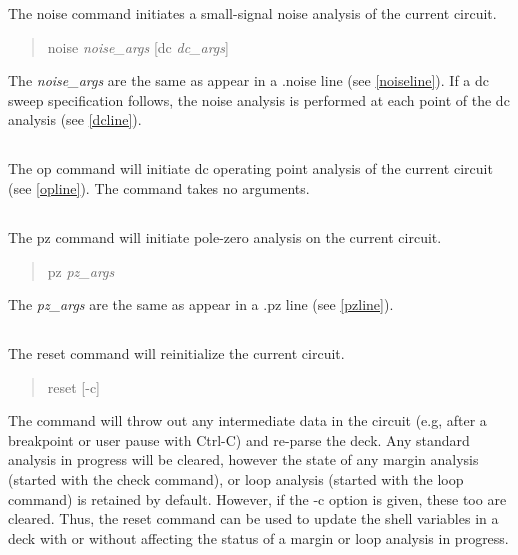 The {\cb noise} command initiates a small-signal noise analysis of the
current circuit.
\begin{quote}\vt
noise {\it noise\_args} [dc {\it dc\_args\/}]
\end{quote}
The {\it noise\_args} are the same as appear in a {\vt .noise} line
(see \ref{noiseline}).  If a dc sweep specification follows, the noise
analysis is performed at each point of the dc analysis (see
\ref{dcline}).

\subsection{}


The {\cb op} command will initiate dc operating point analysis of the
current circuit (see \ref{opline}).  The command takes no arguments.

\subsection{}


The {\cb pz} command will initiate pole-zero analysis on the current
circuit.
\begin{quote}\vt
pz {\it pz\_args}
\end{quote}
The {\it pz\_args} are the same as appear in a {\vt .pz} line (see
\ref{pzline}).

\subsection{}


The {\cb reset} command will reinitialize the current circuit.
\begin{quote}\vt
reset [-c]
\end{quote}
The command will throw out any intermediate data in the circuit (e.g,
after a breakpoint or user pause with {\kb Ctrl-C}) and re-parse the
deck.  Any standard analysis in progress will be cleared, however the
state of any margin analysis (started with the {\cb check} command),
or loop analysis (started with the {\cb loop} command) is retained by
default.  However, if the {\vt -c} option is given, these too are
cleared.  Thus, the {\cb reset} command can be used to update the
shell variables in a deck with or without affecting the status of a
margin or loop analysis in progress.

